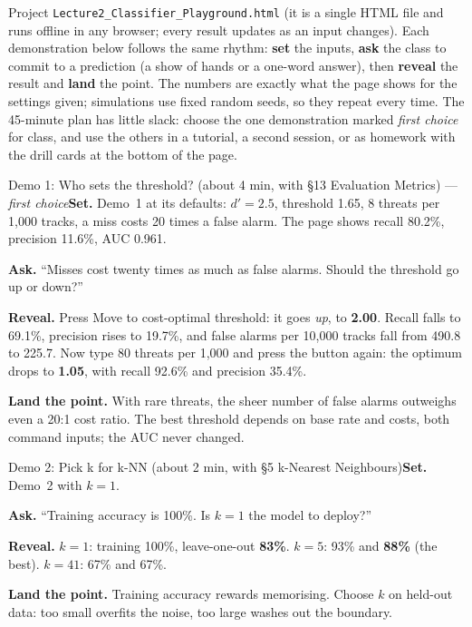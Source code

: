 \documentclass[11pt]{article}
\begin{document}
Project \texttt{Lecture2\_Classifier\_Playground.html} (it is a single HTML file and runs offline in any browser; every result updates as an input changes). Each demonstration below follows the same rhythm: \textbf{set} the inputs, \textbf{ask} the class to commit to a prediction (a show of hands or a one-word answer), then \textbf{reveal} the result and \textbf{land} the point. The numbers are exactly what the page shows for the settings given; simulations use fixed random seeds, so they repeat every time. The 45-minute plan has little slack: choose the one demonstration marked \emph{first choice} for class, and use the others in a tutorial, a second session, or as homework with the drill cards at the bottom of the page.

\begin{live}{Demo 1: Who sets the threshold? (about 4 min, with \S13 Evaluation Metrics) --- \emph{first choice}}\textbf{Set.} Demo~1 at its defaults: $d'=2.5$, threshold 1.65, 8 threats per 1,000 tracks, a miss costs 20 times a false alarm. The page shows recall 80.2\%, precision 11.6\%, AUC 0.961.\par\smallskip\textbf{Ask.} ``Misses cost twenty times as much as false alarms. Should the threshold go up or down?''\par\smallskip\textbf{Reveal.} Press \textsf{Move to cost-optimal threshold}: it goes \emph{up}, to \textbf{2.00}. Recall falls to 69.1\%, precision rises to 19.7\%, and false alarms per 10,000 tracks fall from 490.8 to 225.7. Now type 80 threats per 1,000 and press the button again: the optimum drops to \textbf{1.05}, with recall 92.6\% and precision 35.4\%.\par\smallskip\textbf{Land the point.} With rare threats, the sheer number of false alarms outweighs even a 20:1 cost ratio. The best threshold depends on base rate and costs, both command inputs; the AUC never changed.\end{live}

\begin{live}{Demo 2: Pick k for k-NN (about 2 min, with \S5 k-Nearest Neighbours)}\textbf{Set.} Demo~2 with $k=1$.\par\smallskip\textbf{Ask.} ``Training accuracy is 100\%. Is $k=1$ the model to deploy?''\par\smallskip\textbf{Reveal.} $k=1$: training 100\%, leave-one-out \textbf{83\%}. $k=5$: 93\% and \textbf{88\%} (the best). $k=41$: 67\% and 67\%.\par\smallskip\textbf{Land the point.} Training accuracy rewards memorising. Choose $k$ on held-out data: too small overfits the noise, too large washes out the boundary.\end{live}
\end{document}
